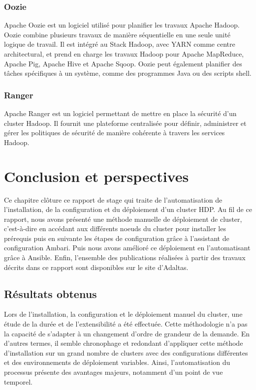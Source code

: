 \documentclass[12pt, french]{report}
\begin{document}
\subsection{Oozie}

Apache Oozie est un logiciel utilisé pour planifier les travaux Apache Hadoop. Oozie combine plusieurs travaux de manière séquentielle en une seule unité logique de travail. Il est intégré au Stack Hadoop, avec YARN comme centre architectural, et prend en charge les travaux Hadoop pour Apache MapReduce, Apache Pig, Apache Hive et Apache Sqoop. Oozie peut également planifier des tâches spécifiques à un système, comme des programmes Java ou des scripts shell.

\subsection{Ranger}

Apache Ranger est un logiciel permettant de mettre en place la sécurité d'un cluster Hadoop. Il fournit une plateforme centralisée pour définir, administrer et gérer les politiques de sécurité de manière cohérente à travers les services Hadoop.

\chapter{Conclusion et perspectives}

Ce chapitre clôture ce rapport de stage qui traite de l'automatisation de l'installation, de la configuration et du déploiement d'un cluster HDP. Au fil de ce rapport, nous avons présenté une méthode manuelle de déploiement de cluster, c'est-à-dire en accédant aux différents noeuds du cluster pour installer les prérequis puis en suivante les étapes de configuration grâce à l'assistant de configuration Ambari. Puis nous avons amélioré ce déploiement en l'automatisant grâce à Ansible. Enfin, l’ensemble des publications réalisées à partir des travaux décrits dans ce rapport sont disponibles sur le site d'Adaltas.

\section{Résultats obtenus}

Lors de l'installation, la configuration et le déploiement manuel du cluster, une étude de la durée et de l’extensibilité a été effectuée. Cette méthodologie n'a pas la capacité de s'adapter à un changement d'ordre de grandeur de la demande. En d'autres termes, il semble chronophage et redondant d'appliquer cette méthode d'installation sur un grand nombre de clusters avec des configurations différentes et des environnements de déploiement variables. Ainsi, l'automatisation du processus présente des avantages majeurs, notamment d'un point de vue temporel. 
\end{document}
